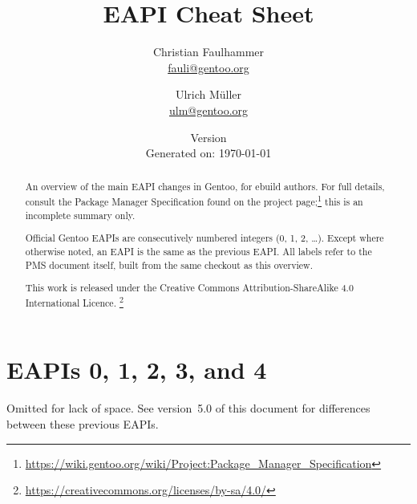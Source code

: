 \documentclass[a4paper,nofoldmark]{leaflet}
\title{EAPI Cheat Sheet}
\author{%
    Christian Faulhammer \\
    \href{mailto:fauli@gentoo.org}{fauli@gentoo.org}
    \and
    Ulrich Müller \\
    \href{mailto:ulm@gentoo.org}{ulm@gentoo.org}
}
\date{%
    Version \version \\
    \ifthenelse{\equal{\gitCommitterDate}{(None)}}
    {Generated on: \today}
    {\printdate{\gitCommitterDate}}%
}
\newcommand{\code}[1]{\texttt{#1}}
\newcommand{\featureref}[1]{\textsc{#1} on page~\pageref{feat:#1}}
\begin{document}
\maketitle
\thispagestyle{empty}
\begin{abstract}
    An overview of the main EAPI changes in Gentoo, for ebuild
    authors.  For full details, consult the Package Manager
    Specification found on the project page;\footnote{%
    \url{https://wiki.gentoo.org/wiki/Project:Package_Manager_Specification}}
    this is an incomplete summary only.

    Official Gentoo EAPIs are consecutively numbered integers (0, 1,
    2, \dots).  Except where otherwise noted, an EAPI is the same as
    the previous EAPI\@.  All labels refer to the PMS document itself,
    built from the same checkout as this overview.


    This work is released under the Creative Commons
    Attribution-ShareAlike 4.0 International Licence.%
    \footnote{\url{https://creativecommons.org/licenses/by-sa/4.0/}}
\end{abstract}

\section{EAPIs 0, 1, 2, 3, and 4}
\label{sec:cs:eapi0-2}
Omitted for lack of space. See version~5.0 of this document for
differences between these previous EAPIs.


\end{document}
